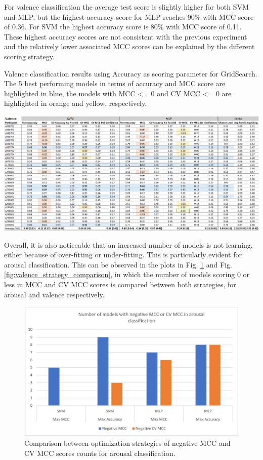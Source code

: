 For valence classification the average test score is slightly higher for both \ac{SVM} and \ac{MLP}, but the highest accuracy score for \ac{MLP} reaches 90\% with \ac{MCC} score of 0.36. For \ac{SVM} the highest accuracy score is 80\% with \ac{MCC} score of 0.11. These highest accuracy scores are not consistent with the previous experiment and the relatively lower associated \ac{MCC} scores can be explained by the different scoring strategy.

\begin{table}[h!]
  \caption{Valence classification results using Accuracy as scoring parameter for GridSearch. The 5 best performing models in terms of accuracy and MCC score are highlighted in blue, the models with MCC <= 0 and CV MCC <= 0 are highlighted in orange and yellow, respectively.}
  \label{tbl:valence_max_acc_results}
  \includegraphics[width=\linewidth]{img/results/valence_max_acc_results.png}
\end{table}

Overall, it is also noticeable that an increased number of models is not learning, either because of over-fitting or under-fitting. This is particularly evident for arousal classification. This can be observed in the plots in Fig. \ref{fig:arousal_strategy_comparison} and Fig. \ref{fig:valence_strategy_comparison}, in which the number of models scoring 0 or less in \ac{MCC} and \ac{CV MCC} scores is compared between both strategies, for arousal and valence respectively.

\begin{figure}[h!]
\includegraphics[width=12cm]{img/results/arousal_strategy_comparison.png}
\centering
\caption{Comparison between optimization strategies of negative MCC and CV MCC scores counts for arousal classification.} \label{fig:arousal_strategy_comparison}
\end{figure}

